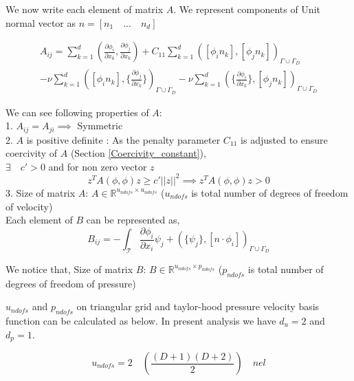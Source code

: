 \documentclass[a4paper]{book}
\begin{document}
We now write each element of matrix $A$. We represent components of Unit normal vector as $n = [n_1 \quad ... \quad n_d]$

\begin{equation} \label{matrix A}
\begin{split}
A_{ij} = \sum_{k=1}^d (\frac{\partial \phi_i}{\partial x_k} , \frac{\partial \phi_j}{\partial x_k}) + C_{11} \sum_{k=1}^d ([\phi_i n_k] , [\phi_j n_k])_{\Gamma \cup \Gamma_D} \\ - \nu \sum_{k=1}^d ([\phi_i n_k] , \lbrace \frac{\partial \phi_j}{\partial x_k} \rbrace)_{\Gamma \cup \Gamma_D} - \nu \sum_{k=1}^d (\lbrace \frac{\partial \phi_i}{\partial x_k} \rbrace , [\phi_j n_k])_{\Gamma \cup \Gamma_D}
\end{split}
\end{equation}

We can see following properties of $A$: 
\\
1. $A_{ij} = A_{ji} \implies$ Symmetric\\
2. $A$ is positive definite : As the penalty parameter $C_{11}$ is adjusted to ensure coercivity of $A$ (Section \ref{Coercivity_constant}),\\
$\exists \quad c' > 0 $ and for non zero vector $z$
\begin{equation}
z^T A( \phi , \phi ) z \geq c' || z ||^2 \implies z^T A( \phi , \phi ) z > 0
\end{equation}
3. Size of matrix $A$: $A \in \mathbb{R}^{u_{ndofs} \times u_{ndofs}}$ ($u_{ndofs}$ is total number of degrees of freedom of velocity)\\

Each element of $B$ can be represented as,\\
\begin{equation} \label{matrix B}
B_{ij} = - \int_\mathcal{T} \frac{\partial \phi_i}{\partial x_i} \psi_j + (\lbrace \psi_j \rbrace , [n \cdot \phi_i])_{\Gamma \cup \Gamma_D}
\end{equation}

We notice that, Size of matrix $B$: $B \in \mathbb{R}^{u_{ndofs} \times p_{ndofs}}$ ($p_{ndofs}$ is total number of degrees of freedom of pressure)

$u_{ndofs}$ and $p_{ndofs}$ on triangular grid and taylor-hood pressure velocity basis function can be calculated as below. In present analysis we have $d_u = 2$ and $d_p = 1$.

\begin{equation} \label{undofs}
u_{ndofs} = 2 \quad \left( \frac{(D+1)(D+2)}{2} \right) \quad nel
\end{equation}
\end{document}
